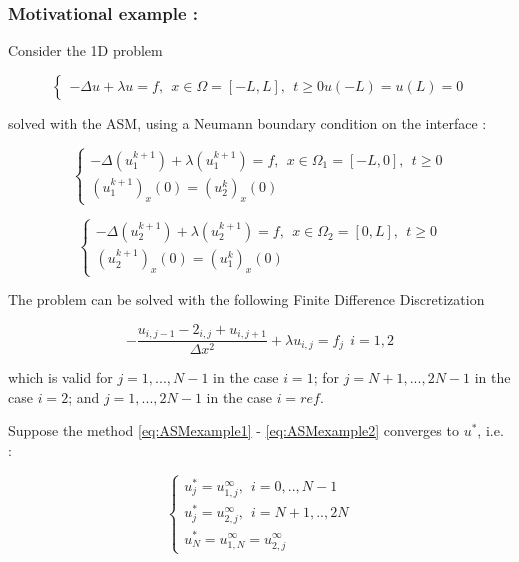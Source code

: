 \subsubsection{Motivational example : }

\indent Consider the 1D problem

\begin{equation}
\begin{cases}
	-\Delta u + \lambda u = f, \ \ x \in \Omega = [-L,L], \ \ t \geq 0
	u(-L) = u(L) = 0
\end{cases}
\end{equation}

\indent solved with the ASM, using a Neumann boundary condition on the interface :

\begin{equation}
	\label{eq:ASMexample1}
    \begin{cases}
        -\Delta(u_1^{k+1}) + \lambda(u_1^{k+1}) = f , \ \ x \in \Omega_1 = [-L,0], \ \ t \geq 0\\
        (u_1^{k+1})_x(0) = (u_2^{k})_x(0)
     \end{cases}
\end{equation}

\begin{equation}
	\label{eq:ASMexample2}
    \begin{cases}
        -\Delta(u_2^{k+1}) + \lambda(u_2^{k+1}) = f , \ \ x \in \Omega_2 = [0,L], \ \ t \geq 0\\
        (u_2^{k+1})_x(0) = (u_1^{k})_x(0)
     \end{cases}
\end{equation}

\indent The problem can be solved with the following Finite Difference Discretization

\begin{equation}
\label{eq:discretExample}
- \frac{u_{i,j-1} - 2_{i,j} + u_{i,j+1} }{\Delta x^2} + \lambda u_{i,j} = f_j \ \ i=1,2
\end{equation}

\noindent which is valid for $j = 1,...,N-1$ in the case $i = 1$; for $j = N+1, ..., 2N-1$ in the case $i = 2$; and $j = 1,...,2N-1$ in the case $i = ref$.

\indent Suppose the method \ref{eq:ASMexample1} - \ref{eq:ASMexample2} converges to $u^*$, i.e. :

\begin{equation}
\begin{cases}
u^*_j = u_{1,j}^\infty, \ \ i = 0,..,N-1 \\
u^*_j = u_{2,j}^\infty, \ \ i = N+1,..,2N \\
u^*_{N} =  u_{1,N}^\infty = u_{2,j}^\infty
\end{cases}
\end{equation}

